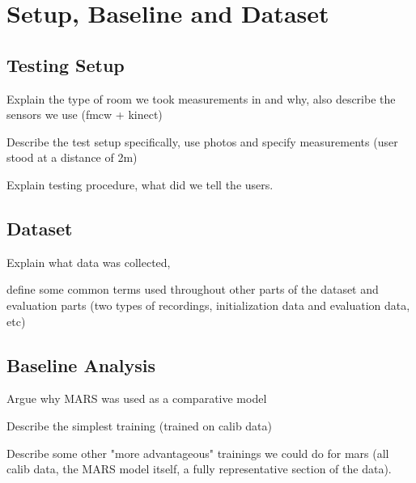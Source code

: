 \chapter{Setup, Baseline and Dataset}
\label{chapter: setup baseline dataset}


\section{Testing Setup}
\label{section: setup baseline dataset - testing setup}

Explain the type of room we took measurements in and why, also describe the sensors we use (fmcw + kinect)

Describe the test setup specifically, use photos and specify measurements (user stood at a distance of 2m)

Explain testing procedure, what did we tell the users.

\section{Dataset}
\label{section: setup baseline dataset - dataset}

Explain what data was collected, 

define some common terms used throughout other parts of the dataset and evaluation parts (two types of recordings, initialization data and evaluation data, etc)


\section{Baseline Analysis}
\label{section: setup baseline dataset - baseline analysis}

Argue why MARS was used as a comparative model

Describe the simplest training (trained on calib data)

Describe some other "more advantageous" trainings we could do for mars (all calib data, the MARS model itself, a fully representative section of the data).



